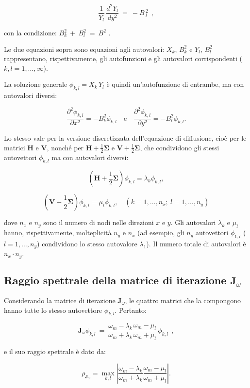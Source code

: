 \[
\frac{1}{Y_l}\, \frac{d^2 Y_l}{dy^2}\ =\ -B\,_l^2\ \ , 
\]

con la condizione: $B_k^2\ +\ B_l^2\ =\ B^2$ .

Le due equazioni sopra sono equazioni agli autovalori: \(X_k\), \(B_k^2\) e \(Y_l\), \(B_l^2\) rappresentano, rispettivamente, gli autofunzioni e gli autovalori corrispondenti (\(k, l = 1, \dots, \infty\)).

La soluzione generale \(\phi_{k,l} = X_k\, Y_l\) è quindi un'autofunzione di entrambe, ma con autovalori diversi:

\[
\frac{\partial^2 \phi_{k,l}}{\partial x^2} = -B_k^2 \phi_{k,l} \quad \text{e} \quad \frac{\partial^2 \phi_{k,l}}{\partial y^2} = -B_l^2 \phi_{k,l}. 
\]

Lo stesso vale per la versione discretizzata dell'equazione di diffusione, cioè per le matrici \(\mathbf{H}\) e \(\mathbf{V}\), nonché per \(\mathbf{H} + \frac{1}{2}\mathbf{\Sigma}\) e \(\mathbf{V} + \frac{1}{2}\mathbf{\Sigma}\), che condividono gli stessi autovettori \(\phi_{k,l}\) ma con autovalori diversi:

\[
\left(\mathbf{H} + \frac{1}{2}\mathbf{\Sigma}\right) \phi_{k,l} = \lambda_k \phi_{k,l}, 
\]

\[
\left(\mathbf{V} + \frac{1}{2}\mathbf{\Sigma}\right) \phi_{k,l} = \mu_l \phi_{k,l}, \quad (k=1,\dots,n_x; \ l=1,\dots,n_y) 
\]

dove \(n_x\) e \(n_y\) sono il numero di nodi nelle direzioni \(x\) e \(y\).
Gli autovalori \(\lambda_k\) e \(\mu_l\) hanno, rispettivamente, molteplicità \(n_y\) e \(n_x\) (ad esempio, gli \(n_y\) autovettori \(\phi_{1,l}\) (\(l=1,\dots,n_y\)) condividono lo stesso autovalore \(\lambda_1\)).
Il numero totale di autovalori è \(n_x \cdot n_y\).


\subsection{Raggio spettrale della matrice di iterazione \(\mathbf{J}_{\omega}\)}

Considerando la matrice di iterazione \(\mathbf{J}_{\omega}\), le quattro matrici che la compongono hanno tutte lo stesso autovettore \(\phi_{k,l}\). Pertanto:

\[
\mathbf{J}_{\omega} \phi_{k,l}\ =\ \frac{\omega_m - \lambda_k}{\omega_m + \lambda_k} \frac{\omega_m - \mu_l}{\omega_m + \mu_l}\, \phi_{k,l}\ \ , 
\]

e il suo raggio spettrale è dato da:

\[
\rho_{\mathbf{J}_{\omega}} = \max_{k,l} \left| \frac{\omega_m - \lambda_k}{\omega_m + \lambda_k} \frac{\omega_m - \mu_l}{\omega_m + \mu_l} \right|. \tag{19}
\]

